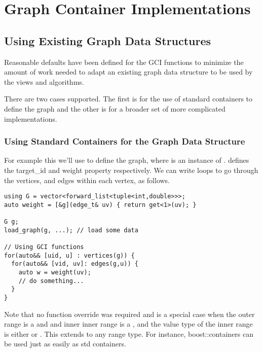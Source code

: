 
\chapter{Graph Container Implementations}

\section{Using Existing Graph Data Structures}
Reasonable defaults have been defined for the GCI functions to minimize the amount of work
needed to adapt an existing graph data structure to be used by the views and algorithms.

There are two cases supported. The first is for the use of standard containers to define the graph and the other
is for a broader set of more complicated implementations.

\subsection{Using Standard Containers for the Graph Data Structure}

For example this we'll use  to define the graph, where  
is an instance of .  defines the target\_id and weight property respectively. We
can write loops to go through the vertices, and edges within each vertex, as follows.

\begin{lstlisting}
using G = vector<forward_list<tuple<int,double>>>;
auto weight = [&g](edge_t& uv) { return get<1>(uv); }

G g;
load_graph(g, ...); // load some data

// Using GCI functions
for(auto&& [uid, u] : vertices(g)) {
  for(auto&& [vid, uv]: edges(g,u)) {
    auto w = weight(uv);
    // do something...
  }
}
\end{lstlisting}

Note that no function override was required and is a special case when the outer range is a  and
and inner inner range is a , and the value type of the inner range is either 
 or . This extends to any range type. For instance, boost::containers can be used
 just as easily as std containers. 

